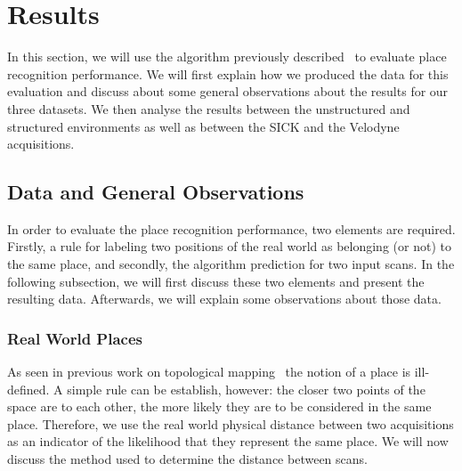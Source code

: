 \section{Results}
\label{sec:chap_slam_results}


In this section, we will use the algorithm previously described~\citep{Steder2011b} to evaluate place recognition performance. We will first explain how we produced the data for this evaluation and discuss about some general observations about the results for our three datasets. We then analyse the results between the unstructured and structured environments as well as between the SICK and the Velodyne acquisitions. 

\subsection{Data and General Observations}
\label{ssec:chap_slam_performance_evaluation}

In order to evaluate the place recognition performance, two elements are required. Firstly, a rule for labeling two positions of the real world as belonging (or not) to the same place, and secondly, the algorithm prediction for two input scans. In the following subsection, we will first discuss these two elements and present the resulting data. Afterwards, we will explain some observations about those data.


\subsubsection{Real World Places}
As seen in previous work on topological mapping~\citep{Valgren2008, Brunskill2007} the notion of a place is ill-defined. A simple rule can be establish, however: the closer two points of the space are to each other, the more likely they are to be considered in the same place. Therefore, we use the real world physical distance between two acquisitions as an indicator of the likelihood that they represent the same place. We will now discuss the method used to determine the distance between scans. 


